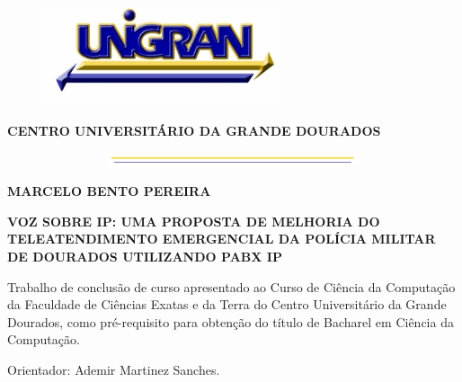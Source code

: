 \begin{center}   %

\begin{figure}[h] %
\centering        %
\includegraphics[width=7.0cm, height=3.0cm]{imagens/UNIGRAN.jpg} %
\end{figure}      %

\textbf{CENTRO UNIVERSITÁRIO DA GRANDE DOURADOS}

\begin{figure}[h]
\centering
\includegraphics[width=15.0cm, height=0.40cm]{imagens/AMARELO.jpg}
\end{figure}


\textbf{MARCELO BENTO PEREIRA}  \\ 

\vspace{4cm}

\textbf{VOZ SOBRE IP: UMA PROPOSTA DE MELHORIA DO TELEATENDIMENTO EMERGENCIAL DA POLÍCIA MILITAR DE DOURADOS UTILIZANDO PABX IP}  %

\vspace{2cm}

\begin{flushright}  %
\parbox[c]{.5\linewidth}{
            Trabalho de conclusão de curso apresentado ao Curso de Ciência da Computação da Faculdade de Ciências Exatas e da Terra do Centro Universitário da Grande Dourados, como pré-requisito para obtenção do título de Bacharel em Ciência da Computação.
            \vspace{1cm}

            Orientador: Ademir Martinez Sanches.
         }
\end{flushright}


\end{center}
